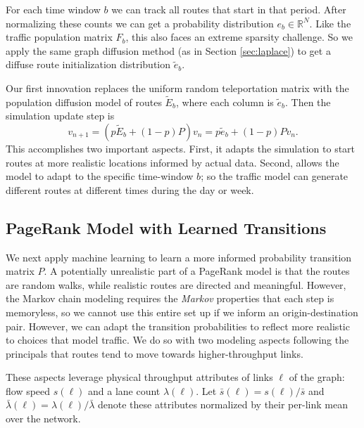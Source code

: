 \documentclass[sigconf, review]{acmart}
\newcommand{\R}{\mathbb{R}}
\begin{document}
For each time window $b$ we can track all routes that start in that period.  After normalizing these counts we can get a probability distribution $e_b \in \R^N$.  Like the traffic population matrix $F_b$, this also faces an extreme sparsity challenge.  So we apply the same graph diffusion method (as in Section \ref{sec:laplace}) to get a diffuse route initialization distribution $\tilde e_b$.  

Our first innovation replaces the uniform random teleportation matrix with the population diffusion model of routes $\tilde E_b$, where each column is $\tilde e_b$.  Then the simulation update step is
\begin{equation}
\label{eq:inf-PR}
v_{n+1} = (p \tilde E_b + (1 - p) P) v_n = p \tilde e_b + (1-p) P v_n.
\end{equation}
This accomplishes two important aspects.  First, it adapts the simulation to start routes at more realistic locations informed by actual data.  Second, allows the model to adapt to the specific time-window $b$; so the traffic model can generate different routes at different times during the day or week.  



\subsection{PageRank Model with Learned Transitions}
\label{sec:learned-transitions}

We next apply machine learning to learn a more informed probability transition matrix $P$.  A potentially unrealistic part of a PageRank model is that the routes are random walks, while realistic routes are directed and meaningful.   However, the Markov chain modeling requires the \emph{Markov} properties that each step is memoryless, so we cannot use this entire set up if we inform an origin-destination pair.  However, we can adapt the transition probabilities to reflect more realistic to choices that model traffic.  
We do so with two modeling aspects following the principals that routes tend to move towards higher-throughput links.  

These aspects leverage physical throughput attributes of links $\ell$ of the graph: 
flow speed $s(\ell)$ and a lane count $\lambda(\ell)$. Let
$\bar s(\ell) = s(\ell)/\bar s$ and
$\bar \lambda(\ell) = \lambda(\ell)/\bar \lambda$ denote these
attributes normalized by their per-link mean over the network.  
\end{document}

